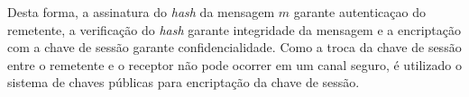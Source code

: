 \documentclass[12pt,twoside,a4paper]{article}
\begin{document}
Desta forma, a assinatura do \textit{hash} da mensagem $m$ garante autenticaçao do remetente, a verificação do \textit{hash} garante integridade da mensagem e a encriptação com a chave de sessão garante confidencialidade. Como a troca da chave de sessão entre o remetente e o receptor não pode ocorrer em um canal seguro, é utilizado o sistema de chaves públicas para encriptação da chave de sessão\nocite{Kurose}.



\end{document}
